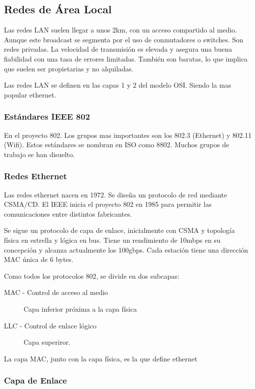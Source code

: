 \subsection{Redes de Área Local} %
        Las redes LAN suelen llegar a unos 2km, con un acceso compartido al medio. Aunque este broadcast se segmenta por el uso de conmutadores o switches. Son redes privadas. La velocidad de transmisión es elevada y asegura una buena fiabilidad con una tasa de errores limitadas. También son baratas, lo que implica que suelen ser propietarias y no alquiladas.

        Las redes LAN se definen en las capas 1 y 2 del modelo OSI. Siendo la mas popular ethernet. 

    \subsubsection{Estándares IEEE 802} %
        En el proyecto 802. Los grupos mas importantes son los 802.3 (Ethernet) y 802.11 (Wifi). Estos estándares se nombran en ISO como 8802. Muchos grupos de trabajo se han disuelto.

    \subsubsection{Redes Ethernet} %
        Las redes ethernet nacen en 1972. Se diseña un protocolo de red mediante CSMA/CD. El IEEE inicia el proyecto 802 en 1985 para permitir las comunicaciones entre distintos fabricantes.
        
        Se sigue un protocolo de capa de enlace, inicialmente con CSMA y topología física en estrella y lógica en bus. Tiene un rendimiento de 10mbps en su concepción y alcanza actualmente los 100gbps. Cada estación tiene una dirección MAC única de 6 bytes.

        Como todos los protocolos 802, se divide en dos subcapas:
        \begin{description}
            \item[MAC - Control de acceso al medio] Capa inferior próxima a la capa física
            \item[LLC - Control de enlace lógico] Capa superiror.
        \end{description}

        La capa MAC, junto con la capa física, es la que define ethernet
    \subsubsection{Capa de Enlace} %
